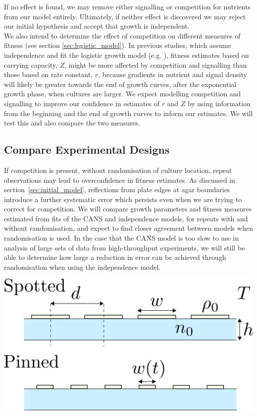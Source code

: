 If no effect is found, we may remove either signalling or competition
for nutrients from our model entirely. Ultimately, if neither effect
is discovered we may reject our initial hypothesis and accept that
growth is independent.
\\

We also intend to determine the effect of competition on different
measures of fitness (see section \ref{sec:logistic_model}). In
previous studies, which assume independence and fit the logistic
growth model (e.g. \citet{Addinall2011}), fitness estimates based on
carrying capacity, \(Z\), might be more affected by competition and
signalling than those based on rate constant, \(r\), because gradients
in nutrient and signal density will likely be greater towards the end
of growth curves, after the exponential growth phase, when cultures
are larger. We expect modelling competition and signalling to improve
our confidence in estimates of \(r\) and \(Z\) by using information from
the beginning and the end of growth curves to inform our estimates. We
will test this and also compare the two measures.

\subsection{Compare Experimental Designs}
\label{sec:comp-exper-designs}

If competition is present, without randomisation of culture location,
repeat observations may lead to overconfidence in fitness
estimates. As discussed in section~\ref{sec:initial_model},
reflections from plate edges at agar boundaries introduce a further
systematic error which persists even when we are trying to correct
for competition. We will compare growth parameters and fitness
measures estimated from fits of the CANS and independence models, for
repeats with and without randomisation, and expect to find closer
agreement between models when randomisation is used. In the case that
the CANS model is too slow to use in analysis of large sets of
data from high-throughput experiments, we will still be able to
determine how large a reduction in error can be achieved through
randomisation when using the independence model.

\begin{Figure}
  \centering
  \includegraphics[width=\linewidth]{qfa_v_sga_vars}
  \label{fig:exp_vars}
\end{Figure}

